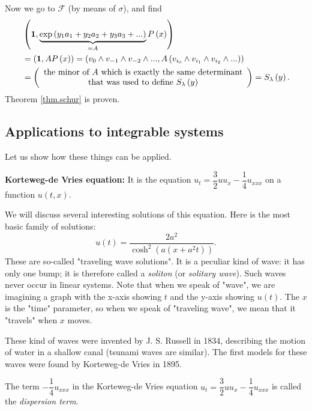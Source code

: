 \documentclass
[numbers=enddot,12pt,final,onecolumn,german,notitlepage]{scrartcl}%
\theoremstyle{definition}
\begin{document}
Now we go to $\mathcal{F}$ (by means of $\sigma$), and find%
\begin{align*}
&  \left(  \mathbf{1},\underbrace{\exp\left(  y_{1}a_{1}+y_{2}a_{2}+y_{3}%
a_{3}+...\right)  }_{=A}P\left(  x\right)  \right) \\
&  =\left(  \mathbf{1},AP\left(  x\right)  \right)  =\left(  v_{0}\wedge
v_{-1}\wedge v_{-2}\wedge...,A\left(  v_{i_{0}}\wedge v_{i_{1}}\wedge
v_{i_{2}}\wedge...\right)  \right) \\
&  =\left(
\begin{array}
[c]{c}%
\text{the minor of }A\text{ which is exactly the same determinant}\\
\text{that was used to define }S_{\lambda}\left(  y\right)
\end{array}
\right)  =S_{\lambda}\left(  y\right)  .
\end{align*}
Theorem \ref{thm.schur} is proven.

\subsection{Applications to integrable systems}

Let us show how these things can be applied.

\textbf{Korteweg-de Vries equation:} It is the equation $u_{t}=\dfrac{3}%
{2}uu_{x}-\dfrac{1}{4}u_{xxx}$ on a function $u\left(  t,x\right)  $.

We will discuss several interesting solutions of this equation. Here is the
most basic family of solutions:%
\[
u\left(  t\right)  =\dfrac{2a^{2}}{\cosh^{2}\left(  a\left(  x+a^{2}t\right)
\right)  }.
\]
These are so-called "traveling wave solutions". It is a peculiar kind of wave:
it has only one bump; it is therefore called a \textit{soliton} (or
\textit{solitary wave}). Such waves never occur in linear systems. Note that
when we speak of "wave", we are imagining a graph with the x-axis showing $t$
and the y-axis showing $u\left(  t\right)  $. The $x$ is the "time" parameter,
so when we speak of "traveling wave", we mean that it "travels" when $x$ moves.

These kind of waves were invented by J. S. Russell in 1834, describing the
motion of water in a shallow canal (tsunami waves are similar). The first
models for these waves were found by Korteweg-de Vries in 1895.

The term $-\dfrac{1}{4}u_{xxx}$ in the Korteweg-de Vries equation
$u_{t}=\dfrac{3}{2}uu_{x}-\dfrac{1}{4}u_{xxx}$ is called the
\textit{dispersion term}.
\end{document}
